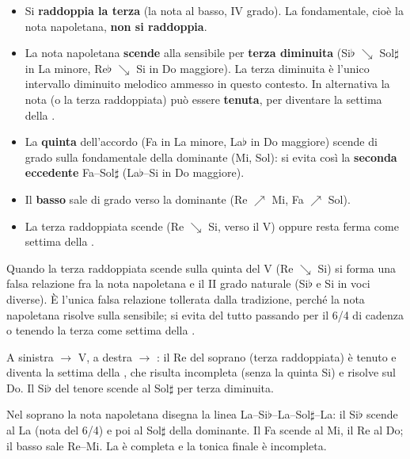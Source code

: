 \begin{regola}
	\label{reg:condotta_napoletana}
	\begin{itemize}
		\item Si \textbf{raddoppia la terza} (la nota al basso, IV grado). La fondamentale, cioè la nota napoletana, \textbf{non si raddoppia}.
		\item La nota napoletana \textbf{scende} alla sensibile per \textbf{terza diminuita} (Si$\flat$ $\searrow$ Sol$\sharp$ in La minore, Re$\flat$ $\searrow$ Si in Do maggiore). La terza diminuita è l'unico intervallo diminuito melodico ammesso in questo contesto. In alternativa la nota (o la terza raddoppiata) può essere \textbf{tenuta}, per diventare la settima della .
		\item La \textbf{quinta} dell'accordo (Fa in La minore, La$\flat$ in Do maggiore) scende di grado sulla fondamentale della dominante (Mi, Sol): si evita così la \textbf{seconda eccedente} Fa--Sol$\sharp$ (La$\flat$--Si in Do maggiore).
		\item Il \textbf{basso} sale di grado verso la dominante (Re $\nearrow$ Mi, Fa $\nearrow$ Sol).
		\item La terza raddoppiata scende (Re $\searrow$ Si, verso il V) oppure resta ferma come settima della .
	\end{itemize}
	Quando la terza raddoppiata scende sulla quinta del V (Re $\searrow$ Si) si forma una falsa relazione fra la nota napoletana e il II grado naturale (Si$\flat$ e Si in voci diverse). È l'unica falsa relazione tollerata dalla tradizione, perché la nota napoletana risolve sulla sensibile; si evita del tutto passando per il 6/4 di cadenza o tenendo la terza come settima della .
\end{regola}

\begin{esempio}
	\label{ex:napoletana_minore}
	A sinistra  $\rightarrow$ V, a destra  $\rightarrow$ : il Re del soprano (terza raddoppiata) è tenuto e diventa la settima della , che risulta incompleta (senza la quinta Si) e risolve sul Do. Il Si$\flat$ del tenore scende al Sol$\sharp$ per terza diminuita.
\end{esempio}

\begin{esempio}
	\label{ex:napoletana_cadenza_minore}
	Nel soprano la nota napoletana disegna la linea La--Si$\flat$--La--Sol$\sharp$--La: il Si$\flat$ scende al La (nota del 6/4) e poi al Sol$\sharp$ della dominante. Il Fa scende al Mi, il Re al Do; il basso sale Re--Mi. La  è completa e la tonica finale è incompleta.
\end{esempio}

